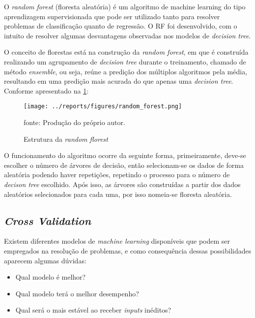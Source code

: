 \documentclass[
  12pt,		%
  a4paper,	%
  openright,%
  oneside,	%
  chapter=TITLE,		%
  section=TITLE,		%
  english,	%
  french,	%
  spanish,	%
  brazil	%
]{abntex2}
\begin{document}
    O \textit{random forest} (floresta aleatória) é um algoritmo de machine learning do tipo aprendizagem 
    supervisionada que pode ser utilizado tanto para resolver problemas de classificação quanto de regressão. 
    O RF foi desenvolvido, com o intuito de resolver algumas desvantagens observadas nos modelos de \textit{decision tree}.
    
    O conceito de florestas está na construção da \textit{random forest}, em que é construída realizando um agrupamento 
    de \textit{decision tree} durante o treinamento, chamado de método \textit{ensemble}, ou seja, reúne a predição 
    dos múltiplos algoritmos pela média, resultando em uma predição mais acurada do que apenas uma \textit{decision tree}. 
    Conforme apresentado na \ref*{estrutura_random_florest}:

    \begin{figure}[ht]
        \centering
        \caption{Estrutura da \textit{random florest}}
        \texttt{[image: ../reports/figures/random\_forest.png]}
        \label{estrutura_random_florest}
        \par
        {\small fonte: Produção do próprio autor.}
    \end{figure}
    
    O funcionamento do algoritmo ocorre da seguinte forma, primeiramente, deve-se escolher o número de árvores de decisão, 
    então selecionam-se os dados de forma aleatória podendo haver repetições, repetindo o processo para o número de 
    \textit{decison tree} escolhido. Após isso, as árvores são construídas a partir dos dados aleatórios selecionados para cada uma,
    por isso nomeia-se floresta aleatória.
    \subsection{\textit{Cross Validation}}
    Existem diferentes modelos de \textit{machine learning} disponíveis que podem ser empregados na resolução de problemas, 
    e como consequência dessas possibilidades aparecem algumas dúvidas:

    \begin{itemize}
        \item Qual modelo é melhor?
        \item Qual modelo terá o melhor desempenho?
        \item Qual será o mais estável ao receber \textit{inputs} inéditos?
    \end{itemize}
\end{document}

